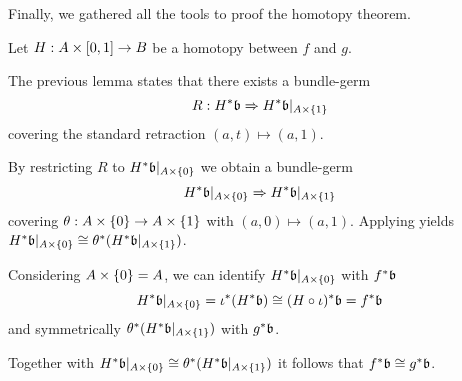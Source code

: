\begin{myparagraph}
    Finally, we gathered all the tools to proof the homotopy theorem.
\end{myparagraph}

\begin{myproof}
    Let $H: A \times{} [0, 1] \to B$ be a homotopy between $f$ and $g$.

    The previous lemma states that there exists a bundle-germ
    \[ R: H^*\mathfrak{b} \Rightarrow{} H^*\mathfrak{b}\vert_{A \times{} \{1\}} \]
    covering the standard retraction $(a, t) \mapsto (a, 1)$.

    By restricting $R$ to $H^*\mathfrak{b}\vert_{A \times{} \{0\}}$ we obtain a bundle-germ
    \[ H^*\mathfrak{b}\vert_{A \times{} \{0\}} \Rightarrow{} H^*\mathfrak{b}\vert_{A \times{} \{1\}} \]
    covering $\theta: A \times{} \{0\} \to A \times{} \{1\}$ with $(a, 0) \mapsto (a, 1)$.
    Applying  yields $H^*\mathfrak{b}\vert_{A \times{} \{0\}} \cong \theta^*(H^*\mathfrak{b}\vert_{A \times{} \{1\}})$.

    Considering $A \times{} \{0\} = A$, we can identify $H^*\mathfrak{b}\vert_{A \times{} \{0\}}$ with $f^*\mathfrak{b}$
    \[ H^*\mathfrak{b}\vert_{A \times \{0\}} = \iota^*(H^*\mathfrak{b}) \cong (H \circ \iota)^*\mathfrak{b} = f^*\mathfrak{b} \]
    and symmetrically $\theta^*(H^*\mathfrak{b}\vert_{A \times{} \{1\}})$ with $g^*\mathfrak{b}$.

    Together with $H^*\mathfrak{b}\vert_{A \times{} \{0\}} \cong \theta^*(H^*\mathfrak{b}\vert_{A \times{} \{1\}})$
    it follows that $f^*\mathfrak{b} \cong g^*\mathfrak{b}$.
\end{myproof}